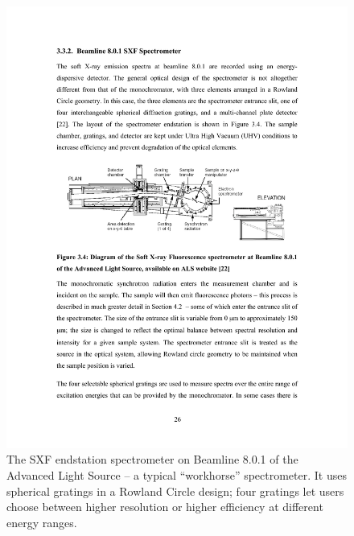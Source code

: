 \begin{figure}[htbp] %
   \centering
   \includegraphics[scale=1.2]{../data/Chapter1/1d_spectrometerExample/1d_bl801SXF_2.pdf} 
   \caption{The SXF endstation spectrometer on Beamline 8.0.1 of the Advanced Light Source -- a typical ``workhorse'' spectrometer.  It uses spherical gratings in a Rowland Circle design; four gratings let users choose between higher resolution or higher efficiency at different energy ranges.  
   }
   \label{1d}
\end{figure}

